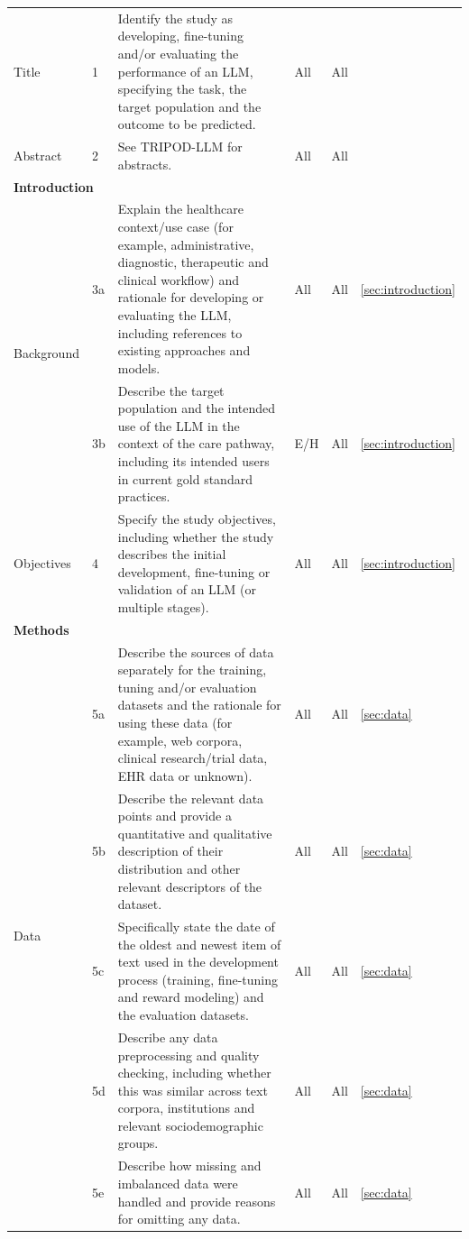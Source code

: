 \documentclass{article}
\begin{document}
\begin{longtable}{p{} l p{} l p{} l }
     \midrule
     Title & 1 & Identify the study as developing, fine-tuning and/or evaluating the performance of an LLM, specifying the task, the target population and the outcome to be predicted. & All & All &  \\
     Abstract &  2 & See TRIPOD-LLM for abstracts. & All & All &  \\
     \midrule
    \multicolumn{3}{l}{\textbf{Introduction}} \\
    \multirow{2}{4em}{Background} & 3a & Explain the healthcare context/use case (for example, administrative, diagnostic, therapeutic and clinical workflow) and rationale for developing or evaluating the LLM, including references to existing approaches and models. & All & All & \ref{sec:introduction} \\
    & 3b & Describe the target population and the intended use of the LLM in the context of the care pathway, including its intended users in current gold standard practices. & E/H & All & \ref{sec:introduction} \\
    Objectives & 4 & Specify the study objectives, including whether the study describes the initial development, fine-tuning or validation of an LLM (or multiple stages). & All & All &  \ref{sec:introduction}\\
    \midrule
    \multicolumn{3}{l}{\textbf{Methods}} \\
    \multirow{5}{4em}{Data} & 5a & Describe the sources of data separately for the training, tuning and/or evaluation datasets and the rationale for using these data (for example, web corpora, clinical research/trial data, EHR data or unknown). & All & All &  \ref{sec:data} \\
    & 5b & Describe the relevant data points and provide a quantitative and qualitative description of their distribution and other relevant descriptors of the dataset. & All & All &  \ref{sec:data} \\
    & 5c & Specifically state the date of the oldest and newest item of text used in the development process (training, fine-tuning and reward modeling) and the evaluation datasets. & All & All &   \ref{sec:data}  \\
    & 5d & Describe any data preprocessing and quality checking, including whether this was similar across text corpora, institutions and relevant sociodemographic groups. & All & All &   \ref{sec:data}  \\
    & 5e & Describe how missing and imbalanced data were handled and provide reasons for omitting any data. & All & All &   \ref{sec:data}  \\

\end{longtable}
\end{document}
